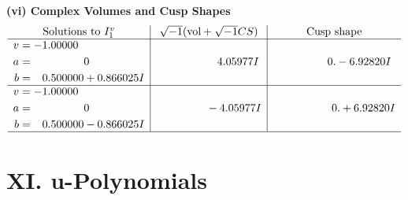 \documentclass[1p]{elsarticle_modified}
\theoremstyle{definition}
\newcommand{\I}{\sqrt{-1}}
\begin{document}
\newpage\flushleft \textbf{(vi) Complex Volumes and Cusp Shapes}
$$\begin{array}{c|c|c}  
\text{Solutions to }I^v_{1}& \I (\text{vol} + \sqrt{-1}CS) & \text{Cusp shape}\\
 \hline 
\begin{aligned}
v &= -1.00000\phantom{ +0.000000I} \\
a &= \phantom{-0.000000 } 0 \\
b &= \phantom{-}0.500000 + 0.866025 I\end{aligned}
 & \phantom{-0.000000 -}4.05977 I & \phantom{-0.000000 } 0. - 6.92820 I \\ \hline\begin{aligned}
v &= -1.00000\phantom{ +0.000000I} \\
a &= \phantom{-0.000000 } 0 \\
b &= \phantom{-}0.500000 - 0.866025 I\end{aligned}
 & \phantom{-0.000000 } -4.05977 I & \phantom{-0.000000 -}0. + 6.92820 I\\
 \hline 
 \end{array}$$\newpage
\newpage\renewcommand{\arraystretch}{1}
\centering \section*{ XI. u-Polynomials}
\end{document}
